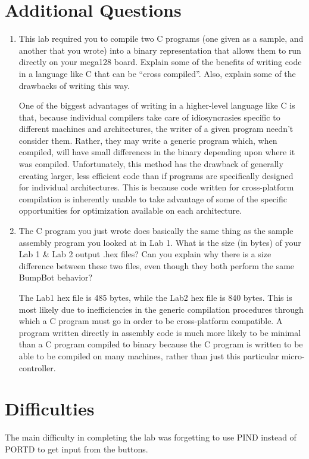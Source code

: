 \documentclass[12pt,letterpaper]{article}
\begin{document}
\section{Additional Questions}
\begin{enumerate}
    \item
    This lab required you to compile two C programs (one given as a sample,
    and another that you wrote) into a binary representation that allows them to
    run directly on your mega128 board. Explain some of the benefits of writing
    code in a language like C that can be “cross compiled”. Also, explain some
    of the drawbacks of writing this way.

    One of the biggest advantages of writing in a higher-level language like C is that, because individual compilers take care of idiosyncrasies specific to different machines and architectures, the writer of a given program needn't consider them. Rather, they may write a generic program which, when compiled, will have small differences in the binary depending upon where it was compiled. Unfortunately, this method has the drawback of generally creating larger, less efficient code than if programs are specifically designed for individual architectures. This is because code written for cross-platform compilation is inherently unable to take advantage of some of the specific opportunities for optimization available on each architecture.

    \item
    The C program you just wrote does basically the same thing as the sample
    assembly program you looked at in Lab 1. What is the size (in bytes) of
    your Lab 1 \& Lab 2 output .hex files? Can you explain why there is a size
    difference between these two files, even though they both perform the same
    BumpBot behavior?

    The Lab1 hex file is 485 bytes, while the Lab2 hex file is 840 bytes. This is most likely due to inefficiencies in the generic compilation procedures through which a C program must go in order to be cross-platform compatible. A program written directly in assembly code is much more likely to be minimal than a C program compiled to binary because the C program is written to be able to be compiled on many machines, rather than just this particular micro-controller.
    
\end{enumerate}

\section{Difficulties}
The main difficulty in completing the lab was forgetting to use PIND instead of PORTD to get input from the buttons.
\end{document}
